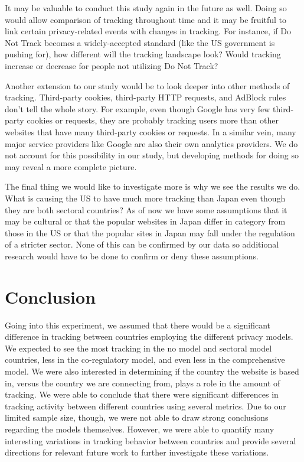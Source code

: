 \documentclass[journal]{IEEEtran}
\begin{document}
It may be valuable to conduct this study again in the future as well. Doing so would allow comparison of tracking throughout time and it may be fruitful to link certain privacy-related events with changes in tracking. For instance, if Do Not Track becomes a widely-accepted standard (like the US government is pushing for), how different will the tracking landscape look? Would tracking increase or decrease for people not utilizing Do Not Track?

Another extension to our study would be to look deeper into other methods of tracking. Third-party cookies, third-party HTTP requests, and AdBlock rules don't tell the whole story. For example, even though Google has very few third-party cookies or requests, they are probably tracking users more than other websites that have many third-party cookies or requests. In a similar vein, many major service providers like Google are also their own analytics providers. We do not account for this possibility in our study, but developing methods for doing so may reveal a more complete picture.

The final thing we would like to investigate more is why we see the results we do. What is causing the US to have much more tracking than Japan even though they are both sectoral countries? As of now we have some assumptions that it may be cultural or that the popular websites in Japan differ in category from those in the US or that the popular sites in Japan may fall under the regulation of a stricter sector. None of this can be confirmed by our data so additional research would have to be done to confirm or deny these assumptions.

\section{Conclusion}
Going into this experiment, we assumed that there would be a significant difference in tracking between countries employing the different privacy models. We expected to see the most tracking in the no model and sectoral model countries, less in the co-regulatory model, and even less in the comprehensive model. We were also interested in determining if the country the website is based in, versus the country we are connecting from, plays a role in the amount of tracking. We were able to conclude that there were significant differences in tracking activity between different countries using several metrics. Due to our limited sample size, though, we were not able to draw strong conclusions regarding the models themselves. However, we were able to quantify many interesting variations in tracking behavior between countries and provide several directions for relevant future work to further investigate these variations.
\end{document}
